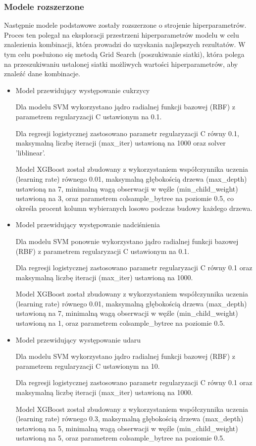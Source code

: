 \documentclass[onecolumn,12pt]{article}
\begin{document}
\subsubsection{Modele rozszerzone}
\noindent
Następnie modele podstawowe zostały rozszerzone o strojenie hiperparametrów. Proces ten polegał na eksploracji przestrzeni hiperparametrów modelu w celu znalezienia kombinacji, która prowadzi do uzyskania najlepszych rezultatów. W tym celu posłużono się metodą Grid Search (poszukiwanie siatki), która polega na przeszukiwaniu ustalonej siatki możliwych wartości hiperparametrów, aby znaleźć dane kombinacje.

\begin{itemize}
\item{Model przewidujący występowanie cukrzycy}

Dla modelu SVM wykorzystano jądro radialnej funkcji bazowej (RBF) z parametrem regularyzacji C ustawionym na 0.1.

Dla regresji logistycznej zastosowano parametr regularyzacji C równy 0.1, maksymalną liczbę iteracji (max\_iter) ustawioną na 1000 oraz solver 'liblinear'.

Model XGBoost został zbudowany z wykorzystaniem współczynnika uczenia (learning rate) równego 0.01, maksymalną głębokością drzewa (max\_depth) ustawioną na 7, minimalną wagą obserwacji w węźle (min\_child\_weight) ustawioną na 3, oraz parametrem colsample\_bytree na poziomie 0.5, co określa procent kolumn wybieranych losowo podczas budowy każdego drzewa.

\item{Model przewidujący występowanie nadciśnienia}

Dla modelu SVM ponownie wykorzystano jądro radialnej funkcji bazowej (RBF) z parametrem regularyzacji C ustawionym na 0.1.

Dla regresji logistycznej zastosowano parametr regularyzacji C równy 0.1 oraz maksymalną liczbę iteracji (max\_iter) ustawioną na 1000.

Model XGBoost został zbudowany z wykorzystaniem współczynnika uczenia (learning rate) równego 0.01, maksymalną głębokością drzewa (max\_depth) ustawioną na 7, minimalną wagą obserwacji w węźle (min\_child\_weight) ustawioną na 1, oraz parametrem colsample\_bytree na poziomie 0.5.

\item{Model przewidujący występowanie udaru}

Dla modelu SVM wykorzystano jądro radialnej funkcji bazowej (RBF) z parametrem regularyzacji C ustawionym na 10.

Dla regresji logistycznej zastosowano parametr regularyzacji C równy 0.1 oraz maksymalną liczbę iteracji (max\_iter) ustawioną na 1000.

Model XGBoost został zbudowany z wykorzystaniem współczynnika uczenia (learning rate) równego 0.3, maksymalną głębokością drzewa (max\_depth) ustawioną na 5, minimalną wagą obserwacji w węźle (min\_child\_weight) ustawioną na 5, oraz parametrem colsample\_bytree na poziomie 0.5.
\end{itemize}
\end{document}
